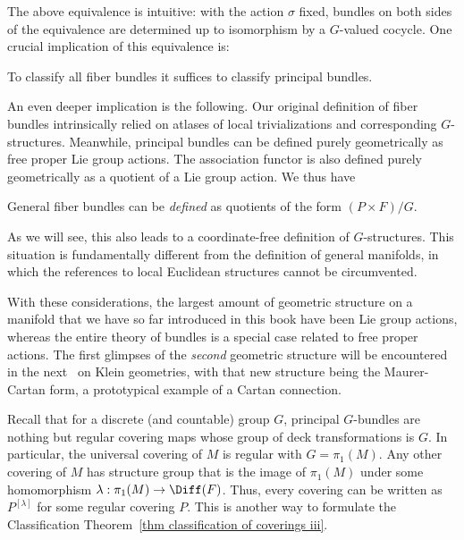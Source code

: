\begin{intu*}
    The above equivalence is intuitive: with the action $\sigma$ fixed, bundles on both sides of the equivalence are determined up to isomorphism by a $G$-valued cocycle. One crucial implication of this equivalence is:
    \begin{center}
        To classify all fiber bundles it suffices to classify principal bundles.
    \end{center}
    An even deeper implication is the following. Our original definition of fiber bundles intrinsically relied on atlases of local trivializations and corresponding $G$-structures. Meanwhile, principal bundles can be defined purely geometrically as free proper Lie group actions. The association functor is also defined purely geometrically as a quotient of a Lie group action. We thus have
    \begin{center}
        General fiber bundles can be \emph{defined} as quotients of the form $(P\times F)\slash G$.
    \end{center}
    As we will see, this also leads to a coordinate-free definition of $G$-structures. This situation is fundamentally different from the definition of general manifolds, in which the references to local Euclidean structures cannot be circumvented. 
    
    With these considerations, the largest amount of geometric structure on a manifold that we have so far introduced in this book have been Lie group actions, whereas the entire theory of bundles is a special case related to free proper actions. The first glimpses of the \emph{second} geometric structure will be encountered in the next \chap\ on Klein geometries, with that new structure being the Maurer-Cartan form, a prototypical example of a Cartan connection.
\end{intu*}

\begin{example}
    Recall that for a discrete (and countable) group $G$, principal $G$-bundles are nothing but regular covering maps whose group of deck transformations is $G$. In particular, the universal covering of $M$ is regular with $G=\pi_1(M)$. Any other covering of $M$ has structure group that is the image of $\pi_1(M)$ under some homomorphism $\lambda:\pi_1(M)\to \Diff(F)$. Thus, every covering can be written as $P^{[\lambda]}$ for some regular covering $P$. This is another way to formulate the Classification Theorem~\ref{thm classification of coverings iii}. 
\end{example}

